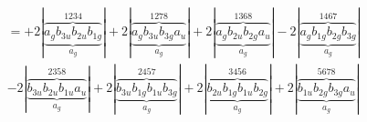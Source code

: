 \documentclass{article}
\begin{document}
\begin{multline*}
=+2\left|\underbrace{\overbrace{a_{g} b_{3u} b_{2u} b_{1g}}^{1 2 3 4}}_{a_{g}}\right|+2\left|\underbrace{\overbrace{a_{g} b_{3u} b_{3g} a_{u}}^{1 2 7 8}}_{a_{g}}\right|+2\left|\underbrace{\overbrace{a_{g} b_{2u} b_{2g} a_{u}}^{1 3 6 8}}_{a_{g}}\right|-2\left|\underbrace{\overbrace{a_{g} b_{1g} b_{2g} b_{3g}}^{1 4 6 7}}_{a_{g}}\right|\\
-2\left|\underbrace{\overbrace{b_{3u} b_{2u} b_{1u} a_{u}}^{2 3 5 8}}_{a_{g}}\right|+2\left|\underbrace{\overbrace{b_{3u} b_{1g} b_{1u} b_{3g}}^{2 4 5 7}}_{a_{g}}\right|+2\left|\underbrace{\overbrace{b_{2u} b_{1g} b_{1u} b_{2g}}^{3 4 5 6}}_{a_{g}}\right|+2\left|\underbrace{\overbrace{b_{1u} b_{2g} b_{3g} a_{u}}^{5 6 7 8}}_{a_{g}}\right|
\end{multline*}
\\\\
\end{document}
